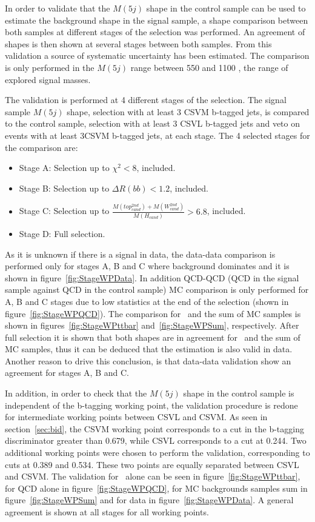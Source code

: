 In order to validate that the $M(5j)$ shape in the control sample can be used to estimate the background shape in the signal sample, a shape comparison between both samples at different stages of the selection was performed. An agreement of shapes is then shown at several stages between both samples. From this validation a source of systematic uncertainty has been estimated. The comparison is only performed in the $M(5j)$ range between 550 and 1100 \GeVcc, the range of explored signal masses.

The validation is performed at 4 different stages of the selection. The signal sample $M(5j)$ shape, selection with at least 3 CSVM b-tagged jets, is compared to the control sample, selection with at least 3 CSVL b-tagged jets and veto on events with at least 3CSVM b-tagged jets, at each stage. The 4 selected stages for the comparison are:
\begin{itemize}
\item Stage A: Selection up to $\chi^{2}<8$, included.
\item Stage B: Selection up to $\Delta R(bb) <1.2$, included.
\item Stage C: Selection up to $\frac{M(top^{2nd}_{cand})+M(W^{2nd}_{cand})}{M(H_{cand})}>6.8$, included.
\item Stage D: Full selection.
\end{itemize}

As it is unknown if there is a signal in data, the data-data comparison is performed only for stages A, B and C where background dominates and it is shown in figure~\ref{fig:StageWPData}. In addition QCD-QCD (QCD in the signal sample against QCD in the control sample) MC comparison is only performed for A, B and C stages due to low statistics at the end of the selection (shown in figure~\ref{fig:StageWPQCD}). The comparison for \ttbar~and the sum of MC samples is shown in figures~\ref{fig:StageWPttbar} and~\ref{fig:StageWPSum}, respectively. After full selection it is shown that both shapes are in agreement for \ttbar~and the sum of MC samples, thus it can be deduced that the estimation is also valid in data. Another reason to drive this conclusion, is that data-data validation show an agreement for stages A, B and C.

In addition, in order to check that the $M(5j)$ shape in the control sample is independent of the b-tagging working point, the validation procedure is redone for intermediate working points between CSVL and CSVM. As seen in section~\ref{sec:bid}, the CSVM working point corresponds to a cut in the b-tagging discriminator greater than 0.679, while CSVL corresponds to a cut at 0.244. Two additional working points were chosen to perform the validation, corresponding to cuts at 0.389 and 0.534. These two points are equally separated between CSVL and CSVM. The validation for \ttbar~alone can be seen in figure~\ref{fig:StageWPttbar}, for QCD alone in figure~\ref{fig:StageWPQCD}, for MC backgrounds samples sum in figure~\ref{fig:StageWPSum} and for data in figure~\ref{fig:StageWPData}. A general agreement is shown at all stages for all working points.

